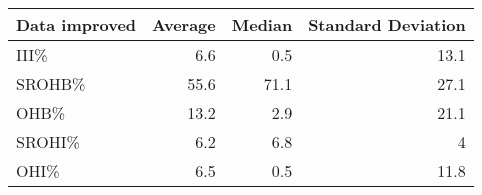 \begin{tabular}{|l|r|r|r|}
\hline
 Data improved   &   Average &   Median &   Standard Deviation \\
\hline
 III\%            &       6.6 &      0.5 &                 13.1 \\
\hline
 SROHB\%          &      55.6 &     71.1 &                 27.1 \\
\hline
 OHB\%            &      13.2 &      2.9 &                 21.1 \\
\hline
 SROHI\%          &       6.2 &      6.8 &                  4   \\
\hline
 OHI\%            &       6.5 &      0.5 &                 11.8 \\
\hline
\end{tabular}
